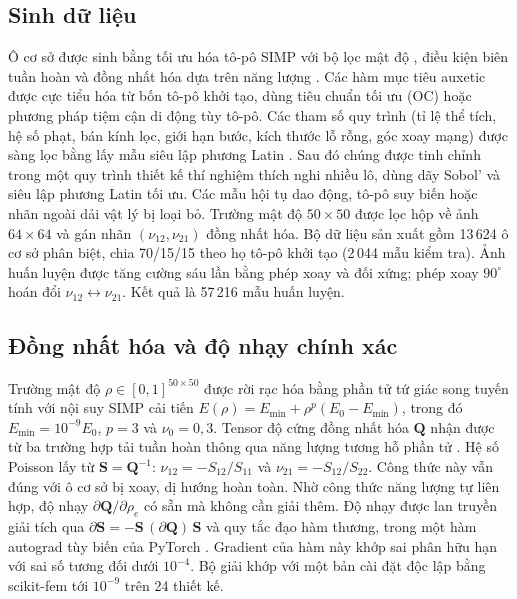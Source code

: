 \documentclass[a4paper,11pt]{article}
\newcommand{\nuot}{\nu_{12}}
\newcommand{\nuto}{\nu_{21}}
\begin{document}
\subsection{Sinh dữ liệu}
Ô cơ sở được sinh bằng tối ưu hóa tô-pô SIMP
\citep{bendsoe1989optimal,sigmund2001code,andreassen2011efficient} với bộ lọc
mật độ \citep{bourdin2001filters}, điều kiện biên tuần hoàn và đồng nhất hóa
dựa trên năng lượng
\citep{guedes1990preprocessing,andreassen2014homogenization,xia2015design}.
Các hàm mục tiêu auxetic được cực tiểu hóa từ bốn tô-pô khởi tạo, dùng tiêu
chuẩn tối ưu (OC) hoặc phương pháp tiệm cận di động \citep{svanberg1987mma}
tùy tô-pô. Các tham số quy trình (tỉ lệ thể tích, hệ số phạt, bán kính lọc,
giới hạn bước, kích thước lỗ rỗng, góc xoay mạng) được sàng lọc bằng lấy mẫu
siêu lập phương Latin \citep{mckay1979lhs}. Sau đó chúng được tinh chỉnh
trong một quy trình thiết kế thí nghiệm thích nghi nhiều lô, dùng dãy Sobol'
\citep{sobol1967distribution} và siêu lập phương Latin tối ưu. Các mẫu hội
tụ dao động, tô-pô suy biến hoặc nhãn ngoài dải vật lý bị loại bỏ. Trường
mật độ $50\times50$ được lọc hộp về ảnh $64\times64$ và gán nhãn
$(\nuot,\nuto)$ đồng nhất hóa. Bộ dữ liệu sản xuất gồm 13\,624 ô cơ sở phân
biệt, chia 70/15/15 theo họ tô-pô khởi tạo (2\,044 mẫu kiểm tra). Ảnh huấn
luyện được tăng cường sáu lần bằng phép xoay và đối xứng; phép xoay
$90^{\circ}$ hoán đổi $\nuot\leftrightarrow\nuto$. Kết quả là 57\,216 mẫu
huấn luyện.

\subsection{Đồng nhất hóa và độ nhạy chính xác}
Trường mật độ $\rho\in[0,1]^{50\times50}$ được rời rạc hóa bằng phần tử tứ
giác song tuyến tính với nội suy SIMP cải tiến
$E(\rho)=E_{\min}+\rho^{p}(E_0-E_{\min})$, trong đó $E_{\min}=10^{-9}E_0$,
$p=3$ và $\nu_0=0{,}3$. Tensor độ cứng đồng nhất hóa $\mathbf{Q}$ nhận được
từ ba trường hợp tải tuần hoàn thông qua năng lượng tương hỗ phần tử
\citep{xia2015design}. Hệ số Poisson lấy từ $\mathbf{S}=\mathbf{Q}^{-1}$:
$\nuot=-S_{12}/S_{11}$ và $\nuto=-S_{12}/S_{22}$. Công thức này vẫn đúng với ô
cơ sở bị xoay, dị hướng hoàn toàn. Nhờ công thức năng lượng tự liên hợp, độ
nhạy $\partial\mathbf{Q}/\partial\rho_e$ có sẵn mà không cần giải thêm. Độ
nhạy được lan truyền giải tích qua
$\partial\mathbf{S}=-\mathbf{S}\,(\partial\mathbf{Q})\,\mathbf{S}$ và quy tắc
đạo hàm thương, trong một hàm autograd tùy biến của PyTorch
\citep{paszke2019pytorch}. Gradient của hàm này khớp sai phân hữu hạn với sai
số tương đối dưới $10^{-4}$. Bộ giải khớp với một bản cài đặt độc lập bằng
scikit-fem \citep{gustafsson2020skfem} tới $10^{-9}$ trên 24 thiết kế.
\end{document}
